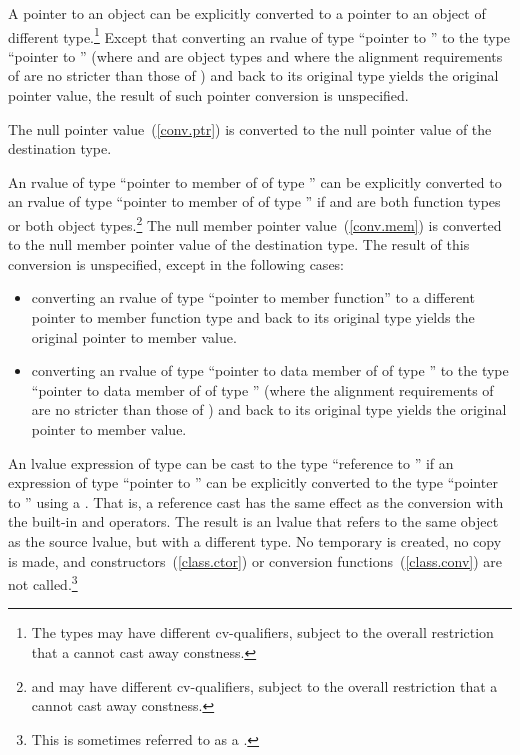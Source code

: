 \pnum
A pointer to an object can be explicitly converted to a pointer to an
object of different type.\footnote{The types may have different
cv-qualifiers, subject to the overall
restriction that a  cannot cast away constness.}
Except that converting an rvalue of type ``pointer to '' to
the type ``pointer to '' (where  and  are
object types and where the alignment requirements of  are no
stricter than those of ) and back to its original type yields
the original pointer value, the result of such pointer conversion is
unspecified.

\pnum
The null pointer value~(\ref{conv.ptr}) is converted to the null pointer value
of the destination type.

\pnum
{}%
%
An rvalue of type ``pointer to member of  of type ''
can be explicitly converted to an rvalue of type ``pointer to member of
 of type '' if  and  are both
function types or both object types.\footnote{ and  may have
different cv-qualifiers, subject to
the overall restriction that a  cannot cast away
constness.} The null member pointer value~(\ref{conv.mem}) is converted to the
null member pointer value of the destination type. The result of this
conversion is unspecified, except in the following cases:

\begin{itemize}
\item converting an rvalue of type ``pointer to member function'' to a
different pointer to member function type and back to its original type
yields the original pointer to member value.

\item converting an rvalue of type ``pointer to data member of 
of type '' to the type ``pointer to data member of 
of type '' (where the alignment requirements of  are
no stricter than those of ) and back to its original type
yields the original pointer to member value.
\end{itemize}

\pnum
{}%
%
An lvalue expression of type  can be cast to the type
``reference to '' if an expression of type ``pointer to
'' can be explicitly converted to the type ``pointer to
'' using a . That is, a reference cast
 has the same effect as the conversion
 with the built-in \tcode{\&} and
\tcode{*} operators. The result is an lvalue that refers to the same
object as the source lvalue, but with a different type. No temporary is
created, no copy is made, and constructors~(\ref{class.ctor}) or conversion
functions~(\ref{class.conv}) are not called.\footnote{This
is sometimes referred to as a .}

